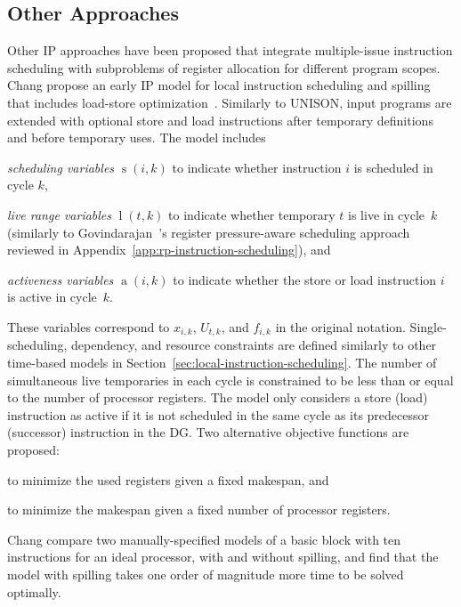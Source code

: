 \documentclass[acmsmall,authorversion,nonacm]{acmart}
\newcommand{\noMathVar}[2]{\operatorname{#1}(#2)}
\newcommand{\var}[2]{$\noMathVar{#1}{#2}$}
\begin{document}
\subsection{Other Approaches}\label{sec:other-integrated}
Other IP approaches have been proposed that integrate multiple-issue
instruction scheduling with subproblems of register allocation for
different program scopes.
Chang \etal{} propose an early IP model for local instruction
scheduling and spilling that includes load-store
optimization~\cite{Chang1997}.
Similarly to UNISON, input programs are extended with optional store
and load instructions after temporary definitions and before temporary
uses.
The model includes
\begin{inparaitem}[]
\item \emph{scheduling variables} \var{s}{i,k} to indicate whether
  instruction $i$ is scheduled in cycle $k$,
\item \emph{live range variables} \var{l}{t,k} to indicate whether
  temporary $t$ is live in cycle~$k$ (similarly to
  Govindarajan~\etal{}'s register pressure-aware scheduling approach
  reviewed in Appendix~\ref{app:rp-instruction-scheduling}), and
\item \emph{activeness variables} \var{a}{i,k} to indicate whether the
  store or load instruction $i$ is active in cycle~$k$.
\end{inparaitem}
These variables correspond to $x_{i,k}$, $U_{t,k}$, and $f_{i,k}$ in
the original notation.
Single-scheduling, dependency, and resource constraints are defined
similarly to other time-based models in
Section~\ref{sec:local-instruction-scheduling}.
The number of simultaneous live temporaries in each cycle is
constrained to be less than or equal to the number of processor
registers.
The model only considers a store (load) instruction as active if it is
not scheduled in the same cycle as its predecessor (successor)
instruction in the DG.
Two alternative objective functions are proposed:
\begin{inparaitem}[]
\item to minimize the used registers given a fixed makespan, and
\item to minimize the makespan given a fixed number of processor
  registers.
\end{inparaitem}
Chang \etal{} compare two manually-specified models of a basic block
with ten instructions for an ideal processor, with and without
spilling, and find that the model with spilling takes one order of
magnitude more time to be solved optimally.
\end{document}
